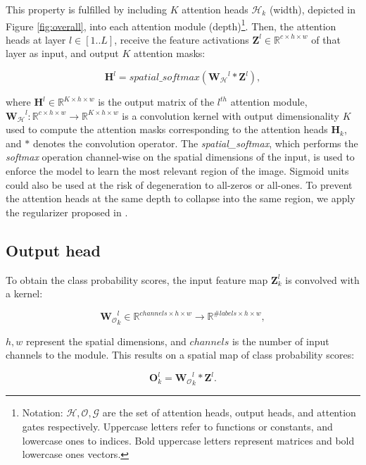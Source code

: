 \documentclass[runningheads]{llncs}
\begin{document}
This property is fulfilled by including $K$ attention heads $\mathcal{H}_k$ (width), depicted in Figure \ref{fig:overall}, into each attention module (depth)\footnote{Notation: $\mathcal{H,O,G}$ are the set of attention heads, output heads, and attention gates respectively. Uppercase letters refer to functions or constants, and lowercase ones to indices. Bold uppercase letters represent matrices and bold lowercase ones vectors.}. Then, the attention heads at layer $l\in [1..L]$, receive the feature activations $\mathbf{Z}^l \in \mathbb{R}^{c \times h\times w}$ of that layer as input, and output $K$ attention masks:

\begin{equation}
\mathbf{H}^l = spatial\_softmax (\mathbf{W_\mathcal{H}}^l \ast \mathbf{Z}^l),
\label{eq:atthead1}
\end{equation}

where $\mathbf{H}^l \in \mathbb{R}^{K\times h\times w}$ is the output matrix of the $l^{th}$ attention module, $\mathbf{W_\mathcal{H}}^l: \mathbb{R}^{c \times h \times w} \rightarrow \mathbb{R}^{K \times h \times w}$ is a convolution kernel with output dimensionality $K$ used to compute the attention masks corresponding to the attention heads $\mathbf{H}_k$, and $\ast$ denotes the convolution operator. The \emph{spatial\_softmax}, which performs the \emph{softmax} operation channel-wise on the spatial dimensions of the input, is used to enforce the model to learn the most relevant region of the image. Sigmoid units could also be used at the risk of degeneration to all-zeros or all-ones. To prevent the attention heads at the same depth to collapse into the same region, we apply the regularizer proposed in \cite{zhao2017diversified}.

\subsection{Output head}
To obtain the class probability scores, the input feature map   $\mathbf{Z}^l_k$ is convolved with a kernel:

$$
\mathbf{W_\mathcal{O}}^l_k \in \mathbb{R}^{channels \times h\times w} \rightarrow \mathbb{R}^{\#labels \times h \times w},
$$

$h,w$ represent the spatial dimensions, and $channels$ is the number of input channels to the module. This results on a spatial map of class probability scores:

\begin{equation}
\mathbf{O}^l_k = \mathbf{W_\mathcal{O}}^l_k \ast \mathbf{Z}^l.
\end{equation}
\end{document}
